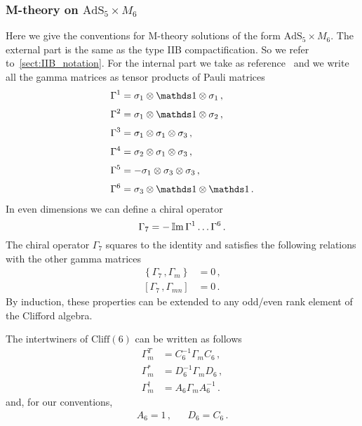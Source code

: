 \documentclass[debug]{phd}
\begin{document}
\subsubsection{\texorpdfstring{M-theory on $\mathrm{AdS}_5 \times M_6$}{M-theory on AdS5 x M6}}
%
Here we give the conventions for M-theory solutions of the form $\mathrm{AdS}_5 \times M_6$. The external part is the same as the type IIB compactification.
So we refer to~\cref{sect:IIB_notation}. For the internal part we take as reference~\cite{VanProeyen:1999ni} and we write all the gamma matrices as tensor products of Pauli matrices
\begin{equation}
\label{gamma6}
	\begin{aligned}
		\Gamma^1 &= \sigma_1 \otimes \id \otimes \sigma_{1}\, , \\[1mm]
		\Gamma^2 &= \sigma_1 \otimes \id \otimes \sigma_{2}\, , \\[1mm]
		\Gamma^3 &= \sigma_1 \otimes \sigma_{1} \otimes \sigma_{3}\, , \\[1mm]
		\Gamma^4 &= \sigma_2 \otimes \sigma_{1} \otimes \sigma_{3}\, , \\[1mm]
		\Gamma^5 &= -\sigma_1 \otimes \sigma_{3} \otimes \sigma_{3}\, , \\[1mm]
		\Gamma^6 &= \sigma_3 \otimes \id \otimes \id\, . 
	\end{aligned}
\end{equation}
In even dimensions we can define a chiral operator
\begin{equation}
\label{chiralgamma}
	\Gamma_7 = - \operatorname{\mathbb{I}m} \Gamma^1 \ldots \Gamma^6\, .
\end{equation}
The chiral operator $\Gamma_7$ squares to the identity and satisfies the following relations with the other gamma matrices
\begin{align*}
	\left\{\Gamma_7\, , \Gamma_{m} \right\} &= 0\, ,\\
	\left[\Gamma_7\, , \Gamma_{mn} \right] &= 0\, .
\end{align*}
By induction, these properties can be extended to any odd/even rank element of the Clifford algebra.

The intertwiners of $\mathrm{Cliff(6)}$ can be written as follows
\begin{align*}
\Gamma_m^T & = C_6^{-1} \Gamma_m C_6 \, , \\
\Gamma_m^* & = D_6^{-1} \Gamma_m D_6 \, , \\
\Gamma_m^{\dagger} & = A_6 \Gamma_m A^{-1}_6 \, .
\end{align*}
and, for our conventions, 
\begin{equation*}
	\begin{array}{lcr}
		A_6 = 1 \, ,& & D_6 = C_6\, .
	\end{array}
\end{equation*}
\end{document}

